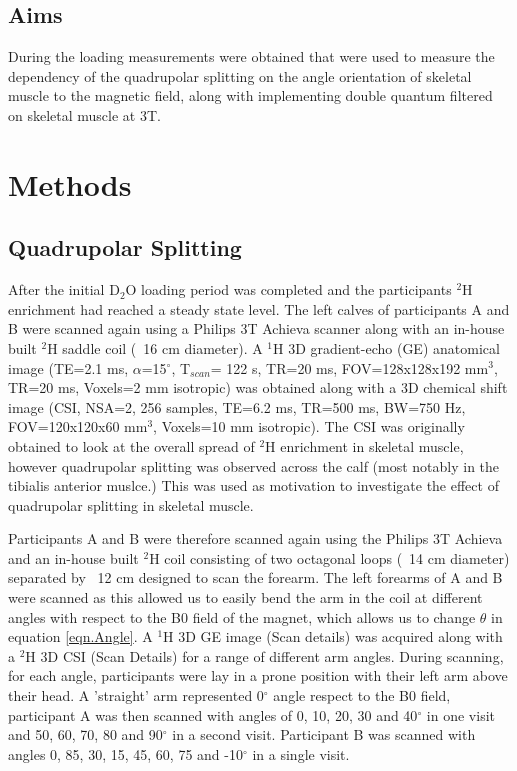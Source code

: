 \documentclass[class=article, crop=false]{standalone}
\begin{document}
\subsection{Aims}

During the loading measurements were obtained that were used to measure the dependency of the quadrupolar splitting on the angle orientation of skeletal muscle to the magnetic field, along with implementing double quantum filtered on skeletal muscle at 3T.

\section{Methods}

\subsection{Quadrupolar Splitting}

After the initial D$_2$O loading period was completed and the participants $^2$H enrichment had reached a steady state level. The left calves of participants A and B were scanned again using a Philips 3T Achieva scanner along with an in-house built $^2$H saddle coil (~16 cm diameter). A $^1$H 3D gradient-echo (GE) anatomical image (TE=2.1 ms, $\alpha$=15$^{\circ}$, T$_{scan}$= 122 s, TR=20 ms, FOV=128x128x192 mm$^3$, TR=20 ms, Voxels=2 mm isotropic) was obtained along with a 3D chemical shift image (CSI, NSA=2, 256 samples, TE=6.2 ms, TR=500 ms, BW=750 Hz, FOV=120x120x60 mm$^3$, Voxels=10 mm isotropic). The CSI was originally obtained to look at the overall spread of $^2$H enrichment in skeletal muscle, however quadrupolar splitting was observed across the calf (most notably in the tibialis anterior muslce.) This was used as motivation to investigate the effect of quadrupolar splitting in skeletal muscle.

Participants A and B were therefore scanned again using the Philips 3T Achieva and an in-house built $^2$H coil consisting of two octagonal loops (~14 cm diameter) separated by ~12 cm designed to scan the forearm. The left forearms of A and B were scanned as this allowed us to easily bend the arm in the coil at different angles with respect to the B0 field of the magnet, which allows us to change $\theta$ in equation \ref{eqn.Angle}. A $^1$H 3D GE image (Scan details) was acquired along with a $^2$H 3D CSI (Scan Details) for a range of different arm angles. During scanning, for each angle, participants were lay in a prone position with their left arm above their head. A 'straight' arm represented  0$^{\circ}$ angle respect to the B0 field, participant A was then scanned with angles of 0, 10, 20, 30 and 40$^{\circ}$ in one visit and 50, 60, 70, 80 and 90$^{\circ}$ in a second visit. Participant B was scanned with angles 0, 85, 30, 15, 45, 60, 75 and -10$^{\circ}$ in a single visit. 
\end{document}
